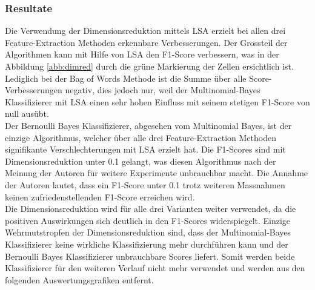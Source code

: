 \subsubsection{Resultate}
Die Verwendung der Dimensionsreduktion mittels LSA erzielt bei allen drei Feature-Extraction Methoden erkennbare Verbesserungen.
Der Grossteil der Algorithmen kann mit Hilfe von LSA den F1-Score verbessern, was in der Abbildung \cref{abb:dimred} durch die grüne Markierung der Zellen ersichtlich ist.
Lediglich bei der \glqq Bag of Words\grqq{} Methode ist die Summe über alle Score-Verbesserungen negativ, dies jedoch nur, weil der Multinomial-Bayes Klassifizierer mit LSA einen sehr hohen Einfluss mit seinem stetigen F1-Score von null ausübt.\\
Der Bernoulli Bayes Klassifizierer, abgesehen vom Multinomial Bayes, ist der einzige Algorithmus, welcher über alle drei Feature-Extraction Methoden signifikante Verschlechterungen mit LSA erzielt hat. Die F1-Scores sind mit Dimensionsreduktion unter 0.1 gelangt, was diesen Algorithmus nach der Meinung der Autoren für weitere Experimente unbrauchbar macht. Die Annahme der Autoren lautet, dass ein F1-Score unter 0.1 trotz weiteren Massnahmen keinen zufriedenstellenden F1-Score erreichen wird.\\
Die Dimensionsreduktion wird für alle drei Varianten weiter verwendet, da die positiven Auswirkungen sich deutlich in den F1-Scores widerspiegelt.
Einzige Wehrmutstropfen der Dimensionsreduktion sind, dass der Multinomial-Bayes Klassifizierer keine wirkliche Klassifizierung mehr durchführen kann und der Bernoulli Bayes Klassifizierer unbrauchbare Scores liefert.
Somit werden beide Klassifizierer für den weiteren Verlauf nicht mehr verwendet und werden aus den folgenden Auswertungsgrafiken entfernt.

